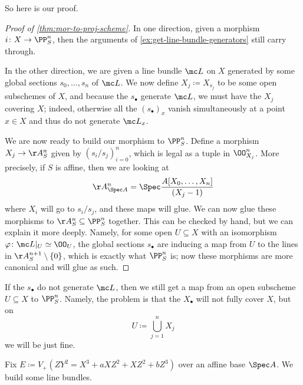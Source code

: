\documentclass[../notes.tex]{subfiles}
\begin{document}
So here is our proof.
\begin{proof}[{Proof of \autoref{thm:mor-to-proj-scheme}}]
	In one direction, given a morphism $i\colon X\to\PP^n_S$, then the arguments of \autoref{ex:get-line-bundle-generators} still carry through.

	In the other direction, we are given a line bundle $\mc L$ on $X$ generated by some global sections $s_0,\ldots,s_n$ of $\mc L$. We now define $X_j\coloneqq X_{s_j}$ to be some open subschemes of $X$, and because the $s_\bullet$ generate $\mc L$, we must have the $X_j$ covering $X$; indeed, otherwise all the $(s_\bullet)_x$ vanish simultaneously at a point $x\in X$ and thus do not generate $\mc L_x$.

	We are now ready to build our morphism to $\PP^n_S$. Define a morphism $X_j\to\AA^n_S$ given by $(s_i/s_j)_{i=0}^n$, which is legal as a tuple in $\OO_{X_j}^n$. More precisely, if $S$ is affine, then we are looking at
	\[\AA^n_{\Spec A}=\Spec\frac{A[X_0,\ldots,X_n]}{(X_j-1)}\]
	where $X_i$ will go to $s_i/s_j$, and these maps will glue. We can now glue these morphisms to $\AA^n_S\subseteq\PP^n_S$ together. This can be checked by hand, but we can explain it more deeply. Namely, for some open $U\subseteq X$ with an isomorphism $\varphi\colon\mc L|_U\simeq\OO_U$, the global sections $s_\bullet$ are inducing a map from $U$ to the lines in $\AA^{n+1}_S\setminus\{0\}$, which is exactly what $\PP^n_S$ is; now these morphisms are more canonical and will glue as such.
\end{proof}
\begin{remark}
	If the $s_\bullet$ do not generate $\mc L$, then we still get a map from an open subscheme $U\subseteq X$ to $\PP^n_S$. Namely, the problem is that the $X_\bullet$ will not fully cover $X$, but on
	\[U\coloneqq\bigcup_{j=1}^nX_j\]
	we will be just fine.
\end{remark}
\begin{exe}
	Fix $E\coloneqq V_+\left(ZY^2=X^3+aXZ^2+XZ^2+bZ^3\right)$ over an affine base $\Spec A$. We build some line bundles.
\end{exe}
\end{document}
